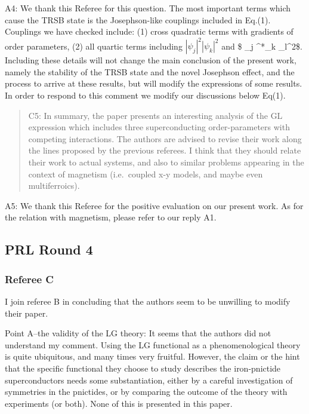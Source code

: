 \documentclass[11pt]{article}
\begin{document}
A4: We thank this Referee for this question. The most important terms
which cause the TRSB state is the Josephson-like couplings included in
Eq.(1). Couplings we have checked include: (1) cross quadratic terms
with gradients of order parameters, (2) all quartic terms including
\(| \psi_j|^2| \psi_k|^2\) and \$ \psi\_j \psi\^{}*\_k\textbar{}
\psi\_l\textbar{}\^{}2\$. Including these details will not change the
main conclusion of the present work, namely the stability of the TRSB
state and the novel Josephson effect, and the process to arrive at these
results, but will modify the expressions of some results. In order to
respond to this comment we modify our discussions below Eq(1).

\begin{quote}
C5: In summary, the paper presents an interesting analysis of the GL
expression which includes three superconducting order-parameters with
competing interactions. The authors are advised to revise their work
along the lines proposed by the previous referees. I think that they
should relate their work to actual systems, and also to similar problems
appearing in the context of magnetism (i.e.~coupled x-y models, and
maybe even multiferroics).
\end{quote}

A5: We thank this Referee for the positive evaluation on our present
work. As for the relation with magnetism, please refer to our reply A1.

\hypertarget{prl-round-4}{%
\subsection{PRL Round 4}\label{prl-round-4}}

\hypertarget{referee-c}{%
\subsubsection{Referee C}\label{referee-c}}

I join referee B in concluding that the authors seem to be unwilling to
modify their paper.

Point A--the validity of the LG theory: It seems that the authors did
not understand my comment. Using the LG functional as a phenomenological
theory is quite ubiquitous, and many times very fruitful. However, the
claim or the hint that the specific functional they choose to study
describes the iron-pnictide superconductors needs some substantiation,
either by a careful investigation of symmetries in the pnictides, or by
comparing the outcome of the theory with experiments (or both). None of
this is presented in this paper.
\end{document}
